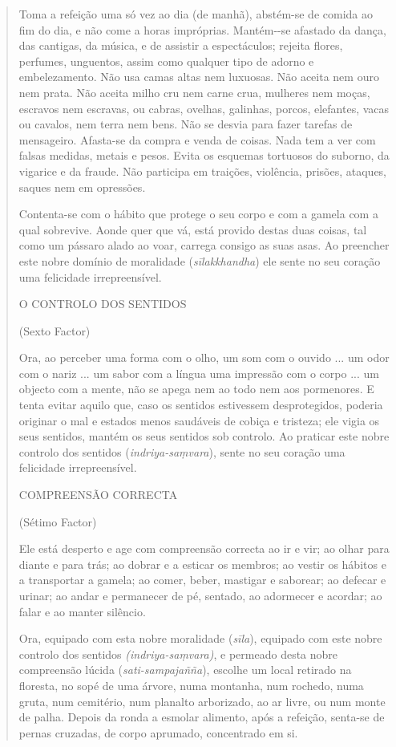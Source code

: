 \begin{quote}
Toma a refeição uma só vez ao dia (de manhã), abstém-se de comida ao fim do dia, e não come a horas impróprias. Mantém-\/-se afastado da dança, das cantigas, da música, e de assistir a espectáculos; rejeita flores, perfumes, unguentos, assim como qualquer tipo de adorno e embelezamento. Não usa camas altas nem luxuosas. Não aceita nem ouro nem prata. Não aceita milho cru nem carne crua, mulheres nem moças, escravos nem escravas, ou cabras, ovelhas, galinhas, porcos, elefantes, vacas ou cavalos, nem terra nem bens. Não se desvia para fazer tarefas de mensageiro. Afasta-se da compra e venda de coisas. Nada tem a ver com falsas medidas, metais e pesos. Evita os esquemas tortuosos do suborno, da vigarice e da fraude. Não participa em traições, violência, prisões, ataques, saques nem em opressões.

Contenta-se com o hábito que protege o seu corpo e com a gamela com a qual sobrevive. Aonde quer que vá, está provido destas duas coisas, tal como um pássaro alado ao voar, carrega consigo as suas asas. Ao preencher este nobre domínio de moralidade (\emph{sīlakkhandha}) ele sente no seu coração uma felicidade irrepreensível.

O CONTROLO DOS SENTIDOS

(Sexto Factor)

Ora, ao perceber uma forma com o olho, um som com o ouvido ... um odor com o nariz ... um sabor com a língua uma impressão com o corpo ... um objecto com a mente, não se apega nem ao todo nem aos pormenores. E tenta evitar aquilo que, caso os sentidos estivessem desprotegidos, poderia originar o mal e estados menos saudáveis de cobiça e tristeza; ele vigia os seus sentidos, mantém os seus sentidos sob controlo. Ao praticar este nobre controlo dos sentidos (\emph{indriya-saṃvara}), sente no seu coração uma felicidade irrepreensível.

COMPREENSÃO CORRECTA

(Sétimo Factor)

Ele está desperto e age com compreensão correcta ao ir e vir; ao olhar para diante e para trás; ao dobrar e a esticar os membros; ao vestir os hábitos e a transportar a gamela; ao comer, beber, mastigar e saborear; ao defecar e urinar; ao andar e permanecer de pé, sentado, ao adormecer e acordar; ao falar e ao manter silêncio.

Ora, equipado com esta nobre moralidade (\emph{sīla}), equipado com este nobre controlo dos sentidos \emph{(indriya-saṃvara)}, e permeado desta nobre compreensão lúcida (\emph{sati-sampajañña}), escolhe um local retirado na floresta, no sopé de uma árvore, numa montanha, num rochedo, numa gruta, num cemitério, num planalto arborizado, ao ar livre, ou num monte de palha. Depois da ronda a esmolar alimento, após a refeição, senta-se de pernas cruzadas, de corpo aprumado, concentrado em si.


\end{quote}
